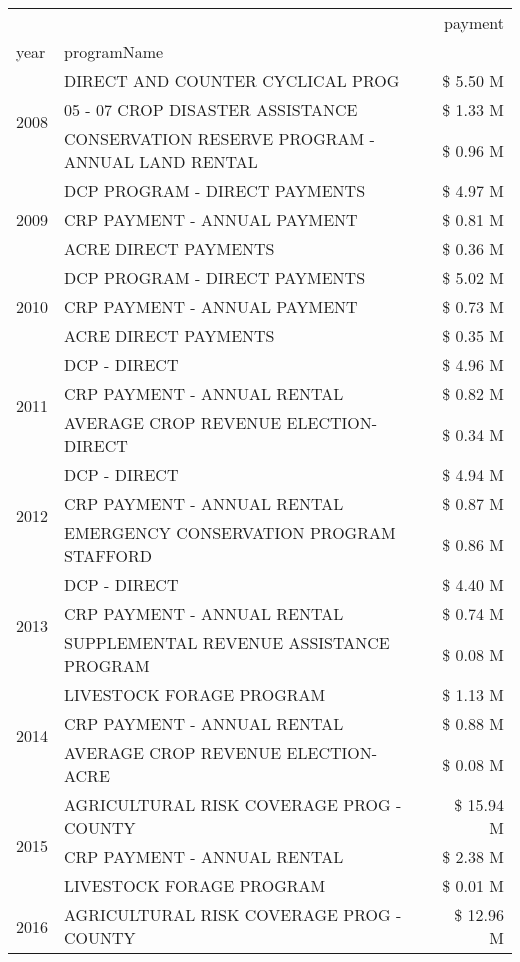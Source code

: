 \begin{tabular}{llr}
\toprule
 &  & payment \\
year & programName &  \\
\midrule
\multirow[t]{3}{*}{2008} & DIRECT AND COUNTER CYCLICAL PROG & \$ 5.50 M \\
 & 05 - 07 CROP DISASTER ASSISTANCE & \$ 1.33 M \\
 & CONSERVATION RESERVE PROGRAM - ANNUAL LAND RENTAL & \$ 0.96 M \\
\cline{1-3}
\multirow[t]{3}{*}{2009} & DCP PROGRAM - DIRECT PAYMENTS & \$ 4.97 M \\
 & CRP PAYMENT - ANNUAL PAYMENT & \$ 0.81 M \\
 & ACRE DIRECT PAYMENTS & \$ 0.36 M \\
\cline{1-3}
\multirow[t]{3}{*}{2010} & DCP PROGRAM - DIRECT PAYMENTS & \$ 5.02 M \\
 & CRP PAYMENT - ANNUAL PAYMENT & \$ 0.73 M \\
 & ACRE DIRECT PAYMENTS & \$ 0.35 M \\
\cline{1-3}
\multirow[t]{3}{*}{2011} & DCP - DIRECT & \$ 4.96 M \\
 & CRP PAYMENT - ANNUAL RENTAL & \$ 0.82 M \\
 & AVERAGE CROP REVENUE ELECTION-DIRECT & \$ 0.34 M \\
\cline{1-3}
\multirow[t]{3}{*}{2012} & DCP - DIRECT & \$ 4.94 M \\
 & CRP PAYMENT - ANNUAL RENTAL & \$ 0.87 M \\
 & EMERGENCY CONSERVATION PROGRAM STAFFORD & \$ 0.86 M \\
\cline{1-3}
\multirow[t]{3}{*}{2013} & DCP - DIRECT & \$ 4.40 M \\
 & CRP PAYMENT - ANNUAL RENTAL & \$ 0.74 M \\
 & SUPPLEMENTAL REVENUE ASSISTANCE PROGRAM & \$ 0.08 M \\
\cline{1-3}
\multirow[t]{3}{*}{2014} & LIVESTOCK FORAGE PROGRAM & \$ 1.13 M \\
 & CRP PAYMENT - ANNUAL RENTAL & \$ 0.88 M \\
 & AVERAGE CROP REVENUE ELECTION-ACRE & \$ 0.08 M \\
\cline{1-3}
\multirow[t]{3}{*}{2015} & AGRICULTURAL RISK COVERAGE PROG - COUNTY & \$ 15.94 M \\
 & CRP PAYMENT - ANNUAL RENTAL & \$ 2.38 M \\
 & LIVESTOCK FORAGE PROGRAM & \$ 0.01 M \\
\cline{1-3}
\multirow[t]{3}{*}{2016} & AGRICULTURAL RISK COVERAGE PROG - COUNTY & \$ 12.96 M \\

\end{tabular}
